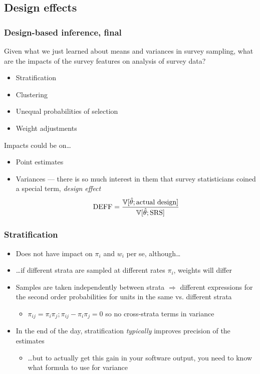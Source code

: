 \documentclass[handout]{beamer}
\newcommand{\Var}{\mathbb{V}}
\begin{document}
\subsection{Design effects}

\begin{frame}\frametitle{Design-based inference, final}

Given what we just learned about means and variances in survey sampling, what are the impacts of
the survey features on analysis of survey data?

\begin{itemize}
    \item Stratification
    \item Clustering
    \item Unequal probabilities of selection
    \item Weight adjustments
\end{itemize}

Impacts could be on\ldots
\begin{itemize}
    \item Point estimates
    \item Variances --- there is so much interest in them that survey statisticians coined a special term,
        \textit{design effect}
        $$
            {\rm DEFF} = \frac{\Var[\hat\theta; \mbox{actual design}]}{\Var[\hat\theta; \mbox{SRS}]}
        $$
\end{itemize}

\end{frame}

\begin{frame}\frametitle{Stratification}

\begin{itemize}
    \item Does not have impact on $\pi_i$ and $w_i$ per se, although\ldots
    \item \ldots if different strata are sampled at different rates $\pi_i$, weights will differ
    \item Samples are taken independently between strata $\Rightarrow$ different
        expressions for the second order probabilities for units in the same vs. different strata
        \begin{itemize}
            \item $\pi_{ij} = \pi_i \pi_j; \pi_{ij} - \pi_i \pi_j=0$ 
                  so no cross-strata terms in variance
        \end{itemize}
    \item In the end of the day, stratification \textit{typically} improves precision of the estimates
        \begin{itemize}
            \item \ldots but to actually get this gain in your software output,
                you need to know what formula to use for variance
        \end{itemize}
\end{itemize}

\end{frame}
\end{document}
